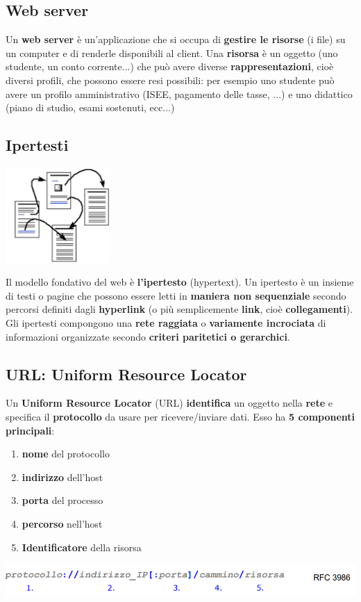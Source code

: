 \documentclass[12pt]{article}
\begin{document}
\subsection{Web server}
Un \textbf{web server} è un'applicazione che si occupa di \textbf{gestire le risorse} (i file) su un computer e di renderle disponibili al client. Una \textbf{risorsa} è un oggetto (uno studente, un conto corrente...) che può avere diverse \textbf{rappresentazioni}, cioè diversi profili, che possono essere resi possibili: per esempio uno studente può avere un profilo amministrativo (ISEE, pagamento delle tasse, ...) e uno didattico (piano di studio, esami sostenuti, ecc...)
\subsection{Ipertesti}
\begin{center}
    \includegraphics[width = 0.30\textwidth]{Images/113.PNG}
\end{center}
Il modello fondativo del web è \textbf{l'ipertesto} (hypertext). Un ipertesto è un insieme di testi o pagine che possono essere letti in \textbf{maniera non sequenziale} secondo percorsi definiti dagli \textbf{hyperlink} (o più semplicemente \textbf{link}, cioè \textbf{collegamenti}). Gli ipertesti compongono una \textbf{rete raggiata} o \textbf{variamente incrociata} di informazioni organizzate secondo \textbf{criteri paritetici o gerarchici}.
\subsection{URL: Uniform Resource Locator}
Un \textbf{Uniform Resource Locator} (URL) \textbf{identifica} un oggetto nella \textbf{rete} e specifica il \textbf{protocollo} da usare per ricevere/inviare dati. Esso ha \textbf{5 componenti principali}:
\begin{enumerate}
    \item \textbf{nome} del protocollo
    \item \textbf{indirizzo} dell'host
    \item \textbf{porta} del processo
    \item \textbf{percorso} nell'host
    \item \textbf{Identificatore} della risorsa
\end{enumerate}
\begin{center}
    \includegraphics[width = 1\textwidth]{Images/114.PNG}
\end{center}
\end{document}

